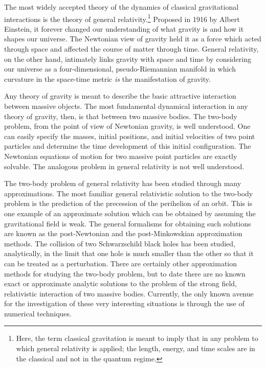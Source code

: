The most widely accepted theory of the dynamics of classical gravitational
interactions is the theory of general relativity.\footnote*{Here, the term
classical gravitation is meant to imply that in any problem to which general
relativity is applied; the length, energy, and time scales are in the classical
and not in the quantum regime.}  Proposed in 1916 by Albert Einstein, it
forever changed our understanding of what gravity is and how it shapes our
universe.  The Newtonian view of gravity held it as a force which acted through
space and affected the course of matter through time.  General relativity, on
the other hand, intimately links gravity with space and time by considering our
universe as a four-dimensional, pseudo-Riemannian manifold in which curvature in
the space-time metric {\it is} the manifestation of gravity.

Any theory of gravity is meant to describe the basic attractive interaction
between massive objects.  The most fundamental dynamical interaction in any
theory of gravity, then, is that between two massive bodies.  The two-body
problem, from the point of view of Newtonian gravity, is well understood.  One
can easily specify the masses, initial positions, and initial velocities of two
point particles and determine the time development of this initial
configuration.   The Newtonian equations of motion for two massive point
particles are exactly solvable.  The analogous problem in general relativity is
not well understood.

The two-body problem of general relativity has been studied through many
approximations.  The most familiar general relativistic solution to the two-body
problem is the prediction of the precession of the perihelion of an orbit.  This
is one example of an approximate solution which can be obtained by assuming the
gravitational field is weak.  The general formalisms for obtaining such
solutions are known as the post-Newtonian and the post-Minkowskian approximation
methods.  The collision of two Schwarzschild black holes has been studied,
analytically, in the limit that one hole is much smaller than the other so that
it can be treated as a perturbation.  There are certainly other approximation
methods for studying the two-body problem, but to date there are no known exact
or approximate analytic solutions to the problem of the strong field,
relativistic interaction of two massive bodies.  Currently, the only known avenue
for the investigation of these very interesting situations is through the use of
numerical techniques.

